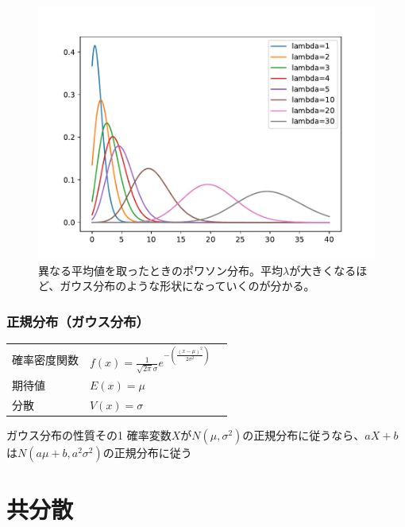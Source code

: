 \begin{figure}[h]
  \centering
  \includegraphics[scale=0.5]{python/poisson_scan.pdf}
  \caption{異なる平均値を取ったときのポワソン分布。平均$\lambda$が大きくなるほど、ガウス分布のような形状になっていくのが分かる。}
\end{figure}

\subsubsection{正規分布（ガウス分布）}

\begin{table}[h]
  \centering
  \begin{tabular}{lll}
    確率密度関数 & $f(x)=\frac{1}{\sqrt{2\pi} \sigma}e^{-\left(\frac{(x-\mu)^2}{2\sigma^2}\right)}$   \\
    期待値      & $E(x)=\mu$    \\
    分散        & $V(x)=\sigma$
  \end{tabular}
\end{table}

\begin{itembox}[l]{ガウス分布の性質その1}
  確率変数$X$が$N(\mu,\sigma^2)$の正規分布に従うなら、$aX+b$は$N(a\mu+b,a^2\sigma^2)$の正規分布に従う
\end{itembox}





\section{共分散}

